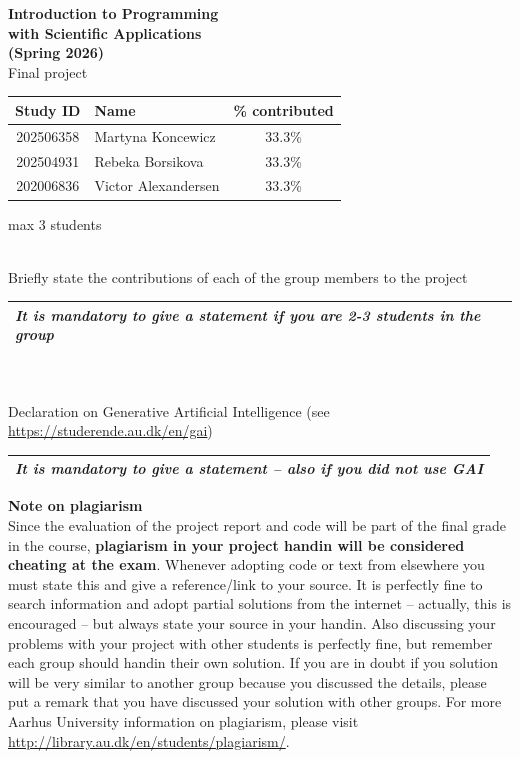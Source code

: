 \documentclass[a4paper, 11pt]{report}
\begin{document}

\thispagestyle{empty}
\setcounter{page}{0}

\begin{center}
  \huge
  \textbf{Introduction to Programming \\
  with Scientific Applications \\
  (Spring 2026)} \\[2ex]
  Final project \\[3ex]
\end{center}
\noindent
\begin{tabularx}{\textwidth}{|c|X|c|}
\multicolumn{1}{c}{Study ID} & 
\multicolumn{1}{l}{Name} & 
\multicolumn{1}{l}{\% contributed} \\
\hline
202506358 & Martyna Koncewicz & 33.3\% \\
\hline
202504931 & Rebeka Borsikova & 33.3\% \\
\hline
202006836 & Victor Alexandersen & 33.3\% \\
\hline
\end{tabularx}
\centerline{max 3 students}
\\[2ex]
\noindent
Briefly state the contributions of each of the group members to the project
\\
\begin{tabularx}{\textwidth}{|X|}
\hline
\textit{\color{red}It is mandatory to give a statement if you are 2-3 students in the group}
\\[3cm]
\hline 
\end{tabularx}
\\[2ex]
\noindent
\\
Declaration on Generative Artificial Intelligence (see \url{https://studerende.au.dk/en/gai})
\begin{tabularx}{\textwidth}{|X|}
\hline
\textit{\color{red}It is mandatory to give a statement -- also if you did not use GAI}
\\[3cm]
\hline 
\end{tabularx}


\vfill
\noindent
\textbf{Note on plagiarism} 
\\[2ex]
Since the evaluation of the project report and code will be part of the final grade in the course, \textbf{plagiarism in your project handin will be considered cheating at the exam}. Whenever adopting code or text from elsewhere you must state this and give a reference/link to your source. It is perfectly fine to search information and adopt partial solutions from the internet -- actually, this is encouraged -- but always state your source in your handin. Also discussing your problems with your project with other students is perfectly fine, but remember each group should handin their own solution. If you are in doubt if you solution will be very similar to another group because you discussed the details, please put a remark that you have discussed your solution with other groups. For more Aarhus University information on plagiarism, please visit \url{http://library.au.dk/en/students/plagiarism/}.
\end{document}
